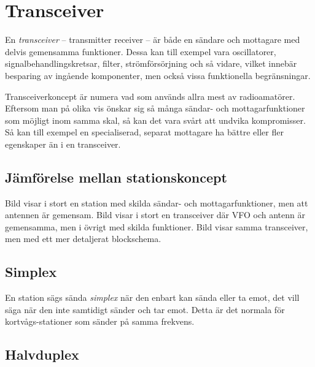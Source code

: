 \newpage
{}


\section{Transceiver}

En \emph{transceiver} -- transmitter receiver -- är både en sändare och
mottagare med delvis gemensamma funktioner.
Dessa kan till exempel vara oscillatorer, signalbehandlingskretsar, filter,
strömförsörjning och så vidare, vilket innebär besparing av ingående
komponenter, men också vissa funktionella begränsningar.

Transceiverkoncept är numera vad som används allra mest av radioamatörer.
Eftersom man på olika vis önskar sig så många sändar- och mottagarfunktioner
som möjligt inom samma skal, så kan det vara svårt att undvika kompromisser.
Så kan till exempel en specialiserad, separat mottagare ha bättre eller fler
egenskaper än i en transceiver.

\subsection{Jämförelse mellan stationskoncept}

Bild  visar i stort en station med skilda sändar- och
mottagarfunktioner, men att antennen är gemensam.
Bild  visar i stort en transceiver där VFO och antenn är
gemensamma, men i övrigt med skilda funktioner.
Bild  visar samma transceiver, men med ett mer detaljerat
blockschema.


\subsection{Simplex}

En station sägs sända \emph{simplex} när den enbart kan sända eller ta emot,
det vill säga när den inte samtidigt sänder och tar emot.
Detta är det normala för kortvågs-stationer som sänder på samma frekvens.

\subsection{Halvduplex}

